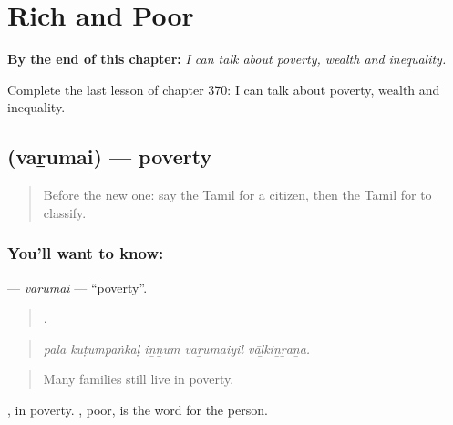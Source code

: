 
\chapter{Rich and Poor}
\label{ch:ta-rich-and-poor}

\begin{chapteropening}
\textbf{By the end of this chapter:} \emph{I can talk about poverty, wealth and inequality.}

Complete the last lesson of chapter 370: I can talk about poverty, wealth and inequality.
\end{chapteropening}

\section[\texorpdfstring{\ta{வறுமை} (vaṟumai)}{வறுமை (vaṟumai)}]{ (vaṟumai) — poverty}

\label{lesson:TA-C370-varumai}



\begin{quote}
Before the new one: say the Tamil for a citizen, then the Tamil for to classify.
\end{quote}

\subsection*{You'll want to know: }
\textbf{} — \emph{vaṟumai} — \textquotedblleft{}poverty\textquotedblright{}.

\begin{quote}
    .
\end{quote}

\begin{quote}
\emph{pala kuṭumpaṅkaḷ iṉṉum vaṟumaiyil vāḻkiṉṟaṉa.}
\end{quote}

\begin{quote}
Many families still live in poverty.
\end{quote}

, in poverty. , poor, is the word for the person.

